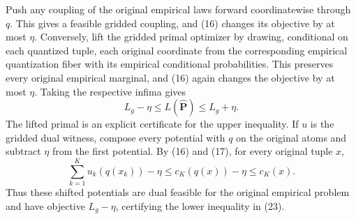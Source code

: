 Push any coupling of the original empirical laws forward coordinatewise through \(q\). This gives a feasible gridded coupling, and (16) changes its objective by at most \(\eta\). Conversely, lift the gridded primal optimizer by drawing, conditional on each quantized tuple, each original coordinate from the corresponding empirical quantization fiber with its empirical conditional probabilities. This preserves every original empirical marginal, and (16) again changes the objective by at most \(\eta\). Taking the respective infima gives
\[
L_g-\eta\le L(\widehat{\mathbf P})\le L_g+\eta.
\tag{23}
\]
The lifted primal is an explicit certificate for the upper inequality. If \(u\) is the gridded dual witness, compose every potential with \(q\) on the original atoms and subtract \(\eta\) from the first potential. By (16) and (17), for every original tuple \(x\),
\[
\sum_{k=1}^Ku_k(q(x_k))-\eta
\le c_K(q(x))-\eta
\le c_K(x).
\]
Thus these shifted potentials are dual feasible for the original empirical problem and have objective \(L_g-\eta\), certifying the lower inequality in (23).

